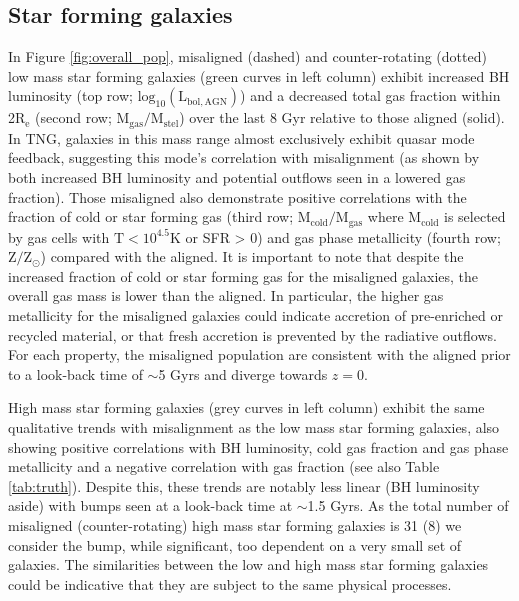 \subsection{Star forming galaxies}
In Figure \ref{fig:overall_pop}, misaligned (dashed) and counter-rotating (dotted) low mass star forming galaxies (green curves in left column) exhibit increased BH luminosity (top row; $\mathrm{log_{10}(L_{bol, AGN})}$) and a decreased total gas fraction within 2$\mathrm{R_{e}}$ (second row; $\mathrm{M_{gas} / M_{stel}}$) over the last 8 Gyr relative to those aligned (solid). In TNG, galaxies in this mass range almost exclusively exhibit quasar mode feedback, suggesting this mode's correlation with misalignment (as shown by both increased BH luminosity and potential outflows seen in a lowered gas fraction). Those misaligned also demonstrate positive correlations with the fraction of cold or star forming gas (third row; $\mathrm{M_{cold} / M_{gas}}$ where $\mathrm{M_{cold}}$ is selected by gas cells with $\mathrm{T < 10^{4.5}K}$ or SFR > 0) and gas phase metallicity (fourth row; $\mathrm{Z / Z_{\odot}}$) compared with the aligned. 
It is important to note that despite the increased fraction of cold or star forming gas for the misaligned galaxies, the overall gas mass is lower than the aligned. In particular, the higher gas metallicity for the misaligned galaxies could indicate accretion of pre-enriched or recycled material, or that fresh accretion is prevented by the radiative outflows. 
For each property, the misaligned population are consistent with the aligned prior to a look-back time of $\sim$5 Gyrs and diverge towards $z=0$.

High mass star forming galaxies (grey curves in left column) exhibit the same qualitative trends with misalignment as the low mass star forming galaxies, also showing positive correlations with BH luminosity, cold gas fraction and gas phase metallicity and a negative correlation with gas fraction (see also Table \ref{tab:truth}). Despite this, these trends are notably less linear (BH luminosity aside) with bumps seen at a look-back time at $\sim$1.5 Gyrs. As the total number of misaligned (counter-rotating) high mass star forming galaxies is 31 (8) we consider the bump, while significant, too dependent on a very small set of galaxies. The similarities between the low and high mass star forming galaxies could be indicative that they are subject to the same physical processes. 

